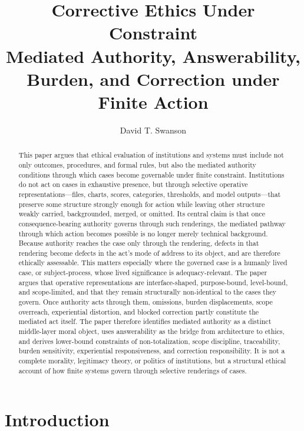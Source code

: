 \documentclass[11pt]{article}
\title{\textbf{Corrective Ethics Under Constraint}\\
\large Mediated Authority, Answerability, Burden, and Correction under Finite Action}
\author{David T. Swanson}
\date{}
\begin{document}
\maketitle

\begin{abstract}
This paper argues that ethical evaluation of institutions and systems must include not only outcomes, procedures, and formal rules, but also the mediated authority conditions through which cases become governable under finite constraint. Institutions do not act on cases in exhaustive presence, but through selective operative representations---files, charts, scores, categories, thresholds, and model outputs---that preserve some structure strongly enough for action while leaving other structure weakly carried, backgrounded, merged, or omitted. Its central claim is that once consequence-bearing authority governs through such renderings, the mediated pathway through which action becomes possible is no longer merely technical background. Because authority reaches the case only through the rendering, defects in that rendering become defects in the act's mode of address to its object, and are therefore ethically assessable. This matters especially where the governed case is a humanly lived case, or subject-process, whose lived significance is adequacy-relevant. The paper argues that operative representations are interface-shaped, purpose-bound, level-bound, and scope-limited, and that they remain structurally non-identical to the cases they govern. Once authority acts through them, omissions, burden displacements, scope overreach, experiential distortion, and blocked correction partly constitute the mediated act itself. The paper therefore identifies mediated authority as a distinct middle-layer moral object, uses answerability as the bridge from architecture to ethics, and derives lower-bound constraints of non-totalization, scope discipline, traceability, burden sensitivity, experiential responsiveness, and correction responsibility. It is not a complete morality, legitimacy theory, or politics of institutions, but a structural ethical account of how finite systems govern through selective renderings of cases.
\end{abstract}

\section{Introduction}
\end{document}
